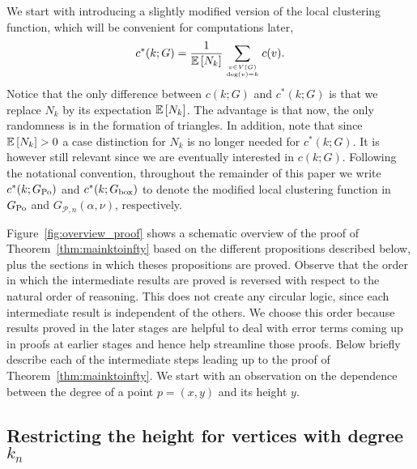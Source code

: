 We start with introducing a slightly modified version of the local clustering function, which will be convenient for computations later,
\begin{equation}\label{eq:def_local_clustering_ast_general}
	c^\ast(k;G) = \frac{1}{\mathbb{E}\left[N_k\right]} \sum_{v \in V(G) \atop \text{deg}(v)=k} c(v).
\end{equation}
Notice that the only difference between $c(k;G)$ and $c^\ast(k;G)$ is that we replace $N_k$ by its expectation $\mathbb{E}\left[N_k\right]$. The advantage is that now, the only randomness is in the formation of triangles. In addition, note that since $\mathbb{E}\left[N_k\right] > 0$ a case distinction for $N_k$ is no longer needed for $c^\ast(k;G)$. It is however still relevant since we are eventually interested in $c(k;G)$. Following the notational convention, throughout the remainder of this paper we write $c^\ast(k; G_{\text{Po}})$ and $c^\ast(k; G_{\text{box}})$ to denote the modified local clustering function in $G_{\text{Po}}$ and $G_{\mathcal{P},n}(\alpha,\nu)$, respectively.

Figure~\ref{fig:overview_proof} shows a schematic overview of the proof of Theorem~\ref{thm:mainktoinfty} based on the different propositions described below, plus the sections in which theses propositions are proved. Observe that the order in which the intermediate results are proved is reversed with respect to the natural order of reasoning. This does not create any circular logic, since each intermediate result is independent of the others. We choose this order because results proved in the later stages are helpful to deal with error terms coming up in proofs at earlier stages and hence help streamline those proofs. Below briefly describe each of the intermediate steps leading up to the proof of Theorem~\ref{thm:mainktoinfty}. We start with an observation on the dependence between the degree of a point $p = (x,y)$ and its height $y$.

\subsection{Restricting the height for vertices with degree $k_n$}

